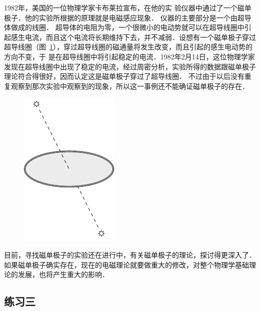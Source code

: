 1982年，美国的一位物理学家卡布莱拉宣布，在他的实
验仪器中通过了一个磁单极子．他的实验所根据的原理就是电磁感应现象．
仪器的主要部分是一个由超导体做成的线圈．
超导体的电阻为零，一个很微小的电动势就可以在超导线圈中引起感生电流，而且这个电流将长期维持下去，并不减弱．设想有一个磁单极子穿过超导线圈（图~\ref{fig_C_2-22}），穿过超导线圈的磁通量将发生改变，而且引起的感生电动势的方向不变，于
是在超导线圈中将引起稳定的电流．1982年2月14日，这位物理学家发现在超导线圈中出现了稳定的电流，经过周密分析，实验所得的数据跟磁单极子理论符合得很好，因而认定这是磁单极子穿过了超导线圈．
不过由于以后没有重复观察到那次实验中观察到的现象，所以这一事例还不能确证磁单极子的存在．
\begin{figure}[htbp]
	\centering
	\includegraphics{fig/C/2-22.pdf}
	\caption{}\label{fig_C_2-22}
\end{figure}


目前，寻找磁单极子的实验还在进行中，有关磁单极子的理论，探讨得更深入了．
如果磁单极子确实存在，现在的电磁理论就要做重大的修改，对整个物理学基础理论的发展，也将产生重大的影响．

\subsection*{练习三}

